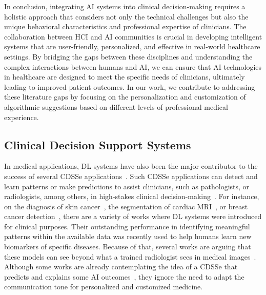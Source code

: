 In conclusion, integrating \ac{AI} systems into clinical decision-making requires a holistic approach that considers not only the technical challenges but also the unique behavioral characteristics and professional expertise of clinicians.
The collaboration between \ac{HCI} and \ac{AI} communities is crucial in developing intelligent systems that are user-friendly, personalized, and effective in real-world healthcare settings.
By bridging the gaps between these disciplines and understanding the complex interactions between humans and \ac{AI}, we can ensure that \ac{AI} technologies in healthcare are designed to meet the specific needs of clinicians, ultimately leading to improved patient outcomes.
In our work, we contribute to addressing these literature gaps by focusing on the personalization and customization of algorithmic suggestions based on different levels of professional medical experience.

\subsection{Clinical Decision Support Systems}
\label{sec:app005003003}

In medical applications, \ac{DL} systems have also been the major contributor to the success of several \ac{CDSSe} applications~\cite{esteva2019guide}.
Such \ac{CDSSe} applications can detect and learn patterns or make predictions to assist clinicians, such as pathologists, or radiologists, among others, in high-stakes clinical decision-making~\cite{10.1145/3555157}.
For instance, on the diagnosis of skin cancer~\cite{Esteva2017}, the segmentation of cardiac \ac{MRI}~\cite{medley2019segmenting}, or breast cancer detection~\cite{MAICAS2019101562}, there are a variety of works where \ac{DL} systems were introduced for clinical purposes.
Their outstanding performance in identifying meaningful patterns within the available data was recently used to help humans learn new biomarkers of specific diseases.
Because of that, several works are arguing that these models can see beyond what a trained radiologist sees in medical images~\cite{McKinney2020, Rajpurkar2022}.
Although some works are already contemplating the idea of a \ac{CDSSe} that predicts and explains some \ac{AI} outcomes~\cite{MAICAS2019101562, CALISTO2022102285}, they ignore the need to adapt the communication tone for personalized and customized medicine.

